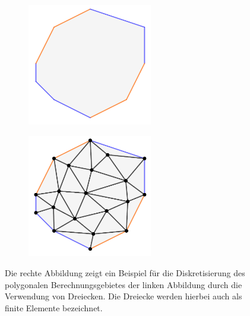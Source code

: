 \documentclass[crop=false]{standalone}
\begin{document}
        \begin{figure}[h]
          \begin{subfigure}[b]{0.5\textwidth}
            \center
            \includegraphics[width=0.6\textwidth]{images/domain_discretization_1.pdf}
          \end{subfigure}
          \begin{subfigure}[b]{0.5\textwidth}
            \center
            \includegraphics[width=0.6\textwidth]{images/domain_discretization_2.pdf}
          \end{subfigure}
          \caption[Diskretisierung eines zweidimensionalen Berechnungsgebietes]{%
            Die rechte Abbildung zeigt ein Beispiel für die Diskretisierung des polygonalen Berechnungsgebietes der linken Abbildung durch die Verwendung von Dreiecken.
            Die Dreiecke werden hierbei auch als finite Elemente bezeichnet.
          }
          \label{fig:domain-discretization}
        \end{figure}
\end{document}
